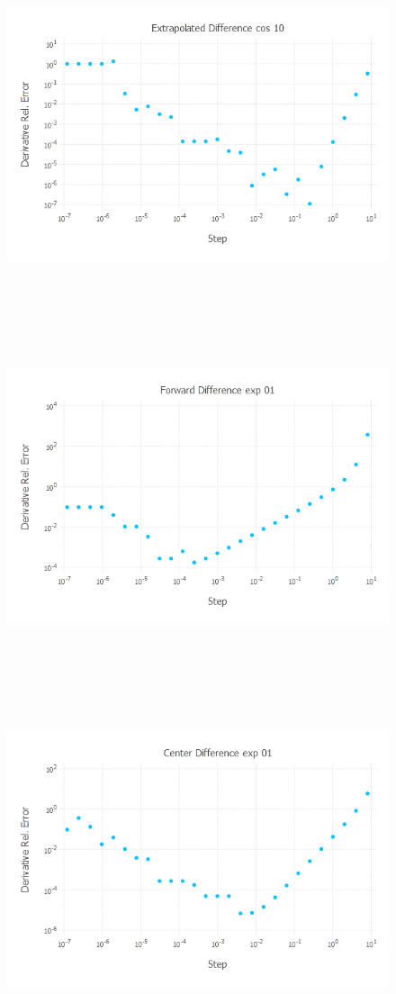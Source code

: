 \documentclass{article}
\begin{document}
\begin{figure}[H]
	\includegraphics[width=6in,height=4in]{"extrap cos 10"}
\end{figure}\begin{figure}[H]
	\includegraphics[width=6in,height=4in]{"forward exp 01"}
\end{figure}
\begin{figure}[H]
	\includegraphics[width=6in,height=4in]{"center exp 01"}
\end{figure}
\end{document}
